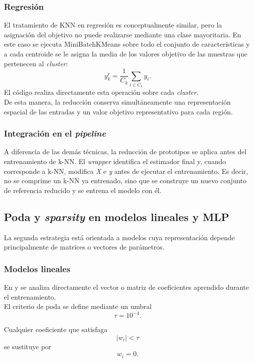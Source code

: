 \documentclass[a4paper,12pt,twoside,final]{book}
\begin{document}
\subsubsection{Regresión}
El tratamiento de KNN en regresión es conceptualmente similar, pero la asignación del objetivo no puede realizarse
mediante una clase mayoritaria. En este caso se ejecuta MiniBatchKMeans sobre todo el conjunto de características y a
cada centroide se le asigna la media de los valores objetivo de las muestras que pertenecen al \textit{cluster}:
\[
y_k^r = \frac{1}{C_k}\sum_{i \in C_k} y_i\text{.}
\]
El código realiza directamente esta operación sobre cada \textit{cluster}.\\

De esta manera, la reducción conserva simultáneamente una representación espacial de las entradas y un valor objetivo
representativo para cada región.

\subsubsection{Integración en el \textit{pipeline}}
A diferencia de las demás técnicas, la reducción de prototipos se aplica antes del entrenamiento de k-NN. El
\textit{wrapper} identifica el estimador final y, cuando corresponde a k-NN, modifica \textit{X} e \textit{y} antes de
ejecutar el entrenamiento. Es decir, no se comprime un k-NN ya entrenado, sino que se construye un nuevo conjunto de
referencia reducido y se entrena el modelo con él.

\subsection{Poda y \textit{sparsity} en modelos lineales y MLP}
La segunda estrategia está orientada a modelos cuya representación depende principalmente de matrices o vectores de
parámetros.

\subsubsection{Modelos lineales}
En  y  se analiza directamente el vector o matriz de coeficientes aprendido
durante el entrenamiento.\\

El criterio de poda se define mediante un umbral
\[
\tau = 10^{-4}\text{.}
\]

Cualquier coeficiente que satisfaga
\[
\left|w_i\right| < \tau
\]
se sustituye por
\[
w_i = 0\text{.}
\]
\end{document}
